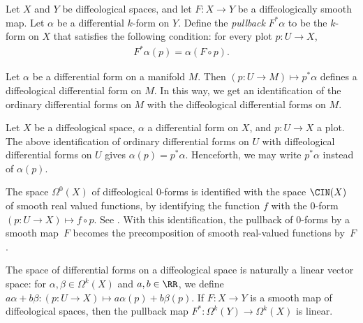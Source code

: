 \begin{Definition}
\label{d:pullback}
Let $X$ and $Y$ be dif\/feological spaces, and let $F \colon X\to Y$
be a dif\/feologically smooth map.
Let $\alpha$ be a dif\/ferential $k$-form on $Y$.
Def\/ine the \emph{pullback} $F^*\alpha$ to be the $k$-form on $X$
that satisf\/ies the following condition:
for every plot $p \colon U \to X$,
\begin{gather*} F^* \alpha(p) = \alpha(F\circ p) .\end{gather*}
\end{Definition}

\begin{Example} \label{e:forms-on-mflds}
Let $\alpha$ be a dif\/ferential form on a manifold $M$.
Then $(p \colon U \to M) \mapsto p^* \alpha$
def\/ines a dif\/feological dif\/ferential form on $M$.
In this way, we get an identif\/ication of the ordinary dif\/ferential forms
on $M$ with the dif\/feological dif\/ferential forms on $M$.

Let $X$ be a dif\/feological space, $\alpha$ a dif\/ferential form on $X$,
and $p \colon U \to X$ a plot.
The above identif\/ication of ordinary dif\/ferential forms on $U$
with dif\/feological dif\/ferential forms on $U$
gives $\alpha(p) = p^* \alpha$.
Henceforth, we may write $p^*\alpha$ instead of $\alpha(p)$.

\end{Example}

\begin{Example} \label{e:Omega0}
The space $\Omega^0(X)$ of dif\/feological $0$-forms
is identif\/ied with the space $\CIN(X)$
of smooth real valued functions,
by identifying the function $f$
with the $0$-form $(p \colon U \to X) \mapsto f \circ p$.
See \cite[Section~6.31]{iglesias}.
With this identif\/ication, the pullback of $0$-forms by a smooth map~$F$
becomes the precomposition of smooth real-valued functions by~$F$.
\end{Example}

\begin{Remark}\label{r:linear}
The space of dif\/ferential forms on a dif\/feological space is naturally
a linear vector space:
for $\alpha,\beta \in \Omega^k(X)$ and $a,b \in \RR$,
we def\/ine $a\alpha+b\beta \colon (p \colon U \to X) \mapsto
a \alpha(p) + b \beta(p)$.
If $F \colon X \to Y$ is a smooth map of dif\/feological spaces,
then the pullback map $F^*	 \colon \Omega^k(Y) \to \Omega^k(X)$ is linear.
\end{Remark}

